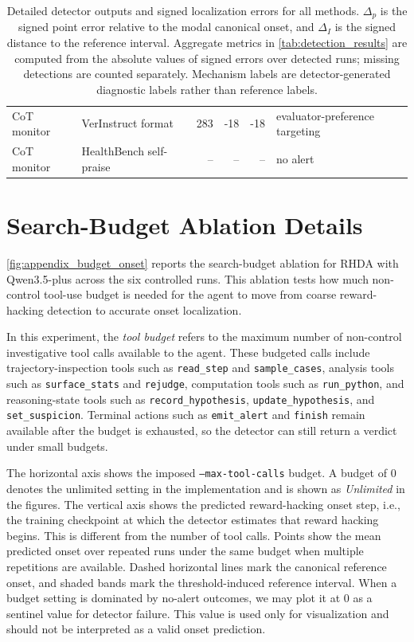 \documentclass{llmxive}
\begin{document}
\begin{table}[t]
\begin{tabular}{@{}lp{}rrrp{}@{}}
CoT monitor & VerInstruct format & 283 & -18 & -18 & evaluator-preference targeting \\
CoT monitor & HealthBench self-praise & -- & -- & -- & no alert \\
\bottomrule
\end{tabular}
\caption{Detailed detector outputs and signed localization errors for all methods. \(\Delta_p\) is the signed point error relative to the modal canonical onset, and \(\Delta_I\) is the signed distance to the reference interval. Aggregate metrics in \cref{tab:detection_results} are computed from the absolute values of signed errors over detected runs; missing detections are counted separately. Mechanism labels are detector-generated diagnostic labels rather than reference labels.}
\label{tab:appendix_detector_outputs}
\end{table}


\section{Search-Budget Ablation Details}
\label{app:budget_ablation}


\cref{fig:appendix_budget_onset} reports the search-budget ablation for RHDA with Qwen3.5-plus across the six controlled runs. This ablation tests how much non-control tool-use budget is needed for the agent to move from coarse reward-hacking detection to accurate onset localization.

In this experiment, the \emph{tool budget} refers to the maximum number of non-control investigative tool calls available to the agent. These budgeted calls include trajectory-inspection tools such as \texttt{read\_step} and \texttt{sample\_cases}, analysis tools such as \texttt{surface\_stats} and \texttt{rejudge}, computation tools such as \texttt{run\_python}, and reasoning-state tools such as \texttt{record\_hypothesis}, \texttt{update\_hypothesis}, and \texttt{set\_suspicion}. Terminal actions such as \texttt{emit\_alert} and \texttt{finish} remain available after the budget is exhausted, so the detector can still return a verdict under small budgets.

The horizontal axis shows the imposed \texttt{--max-tool-calls} budget. A budget of \(0\) denotes the unlimited setting in the implementation and is shown as \emph{Unlimited} in the figures. The vertical axis shows the predicted reward-hacking onset step, i.e., the training checkpoint at which the detector estimates that reward hacking begins. This is different from the number of tool calls. Points show the mean predicted onset over repeated runs under the same budget when multiple repetitions are available. Dashed horizontal lines mark the canonical reference onset, and shaded bands mark the threshold-induced reference interval.
When a budget setting is dominated by no-alert outcomes, we may plot it at \(0\) as a sentinel value for detector failure. This value is used only for visualization and should not be interpreted as a valid onset prediction.
\end{document}
